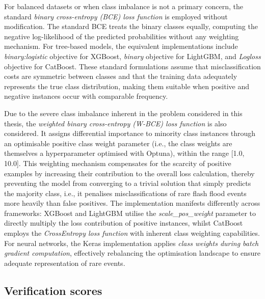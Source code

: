 For  balanced datasets or when class imbalance is not a primary concern, the standard \textit{binary cross-entropy (BCE) loss function} is employed without modification. The standard BCE treats the binary classes equally, computing the negative log-likelihood of the predicted probabilities without any weighting mechanism. For tree-based models, the equivalent implementations include \textit{binary:logistic} objective for XGBoost, \textit{binary} objective for LightGBM, and \textit{Logloss} objective for CatBoost. These standard formulations assume that misclassification costs are symmetric between classes and that the training data adequately represents the true class distribution, making them suitable when positive and negative instances occur with comparable frequency.

Due  to the severe class imbalance inherent in the problem considered in this thesis, the \textit{weighted binary cross-entropy (W-BCE) loss function} is also considered. It assigns differential importance to minority class instances through an optimisable positive class weight parameter (i.e., the class weights are themselves a hyperparameter optimised with Optuna), within the range [1.0, 10.0]. This weighting mechanism compensates for the scarcity of positive examples by increasing their contribution to the overall loss calculation, thereby preventing the model from converging to a trivial solution that simply predicts the majority class, i.e., it penalises misclassifications of rare flash flood events more heavily than false positives. The implementation manifests differently across frameworks: XGBoost and LightGBM utilise the \textit{scale\_pos\_weight} parameter to directly multiply the loss contribution of positive instances, whilst CatBoost employs the \textit{CrossEntropy loss function} with inherent class weighting capabilities. For neural networks, the Keras implementation applies \textit{class weights during batch gradient computation}, effectively rebalancing the optimisation landscape to ensure adequate representation of rare events.


\subsection{Verification scores}
\label{data_driven_flash_floods_short_medium_range_methods_verif_scores}



